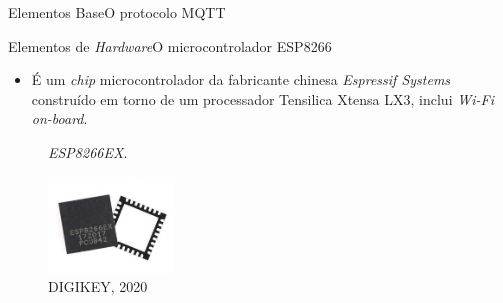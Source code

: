 \begin{frame}{Elementos Base}{O protocolo MQTT}
    \begin{table}[H]
        \centering
        \caption{Caracteres especiais utilizados para envio e recebimento no protocolo MQTT.}
        \label{tab:simbolos_mqtt}
    \end{table}

\end{frame}


\begin{frame}{Elementos de \textit{Hardware}}{O microcontrolador ESP8266}
    \begin{itemize}
        \item É um \textit{chip} microcontrolador da fabricante chinesa \textit{Espressif Systems} construído em torno de um processador Tensilica Xtensa LX3, inclui \textit{Wi-Fi on-board}.
    \end{itemize}

    \begin{figure}[H]
        \centering
        \caption{\textit{ESP8266EX}.}
        \includegraphics[width=0.3\textwidth]{figuras/esp8266ex.jpg}
        \caption*{\small{DIGIKEY, 2020}}
        \label{fig:esp8266ex}
    \end{figure} 
\end{frame}


